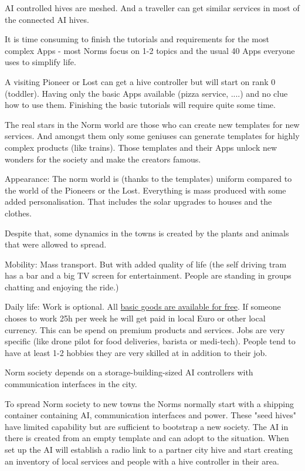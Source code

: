 AI controlled hives are meshed. And a traveller can get similar services in most of the connected AI hives.

It is time consuming to finish the tutorials and requirements for the most complex Apps - most Norms focus on 1-2 topics and the usual 40 Apps everyone uses to simplify life.

A visiting Pioneer or Lost can get a hive controller but will start on rank 0 (toddler). Having only the basic Apps available (pizza service, ....) and no clue how to use them. Finishing the basic tutorials will require quite some time.

The real stars in the Norm world are those who can create new templates for new services. And amongst them only some geniuses can generate templates for highly complex products (like trains).
Those templates and their Apps unlock new wonders for the society and make the creators famous.

Appearance: The norm world is (thanks to the templates) uniform compared to the world of the Pioneers or the Lost. Everything is mass produced with some added personalisation. That includes the solar upgrades to houses and the clothes.

Despite that, some dynamics in the towns is created by the plants and animals that were allowed to spread.

Mobility: Mass transport. But with added quality of life (the self driving tram has a bar and a big TV screen for entertainment. People are standing in groups chatting and enjoying the ride.)

Daily life: Work is optional. All \hyperref[sec:basic income]{basic goods are available for free}. If someone choses to work 25h per week he will get paid in local Euro or other local currency. This can be spend on premium products and services. Jobs are very specific (like drone pilot for food deliveries, barista or medi-tech). People tend to have at least 1-2 hobbies they are very skilled at in addition to their job.

Norm society depends on a storage-building-sized AI controllers with communication interfaces in the city.

To spread Norm society to new towns the Norms normally start with a shipping container containing AI, communication interfaces and power. These "seed hives" have limited capability but are sufficient to bootstrap a new society. The AI in there is created from an empty template and can adopt to the situation. When set up the AI will establish a radio link to a partner city hive and start creating an inventory of local services and people with a hive controller in their area.

